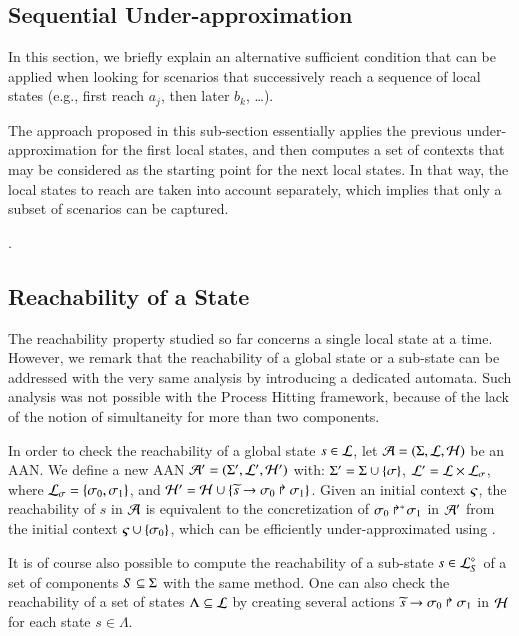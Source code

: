 \subsection{Sequential Under-approximation}
\label{ssec:ordered-ua}

In this section, we briefly explain an alternative sufficient condition that
can be applied when looking for scenarios that successively reach a sequence of local states (e.g.,
first reach $a_j$, then later $b_k$, \ldots).

The approach proposed in this sub-section essentially applies the previous under-approximation for
the first local states, and then computes a set of contexts that may be considered as the starting
point for the next local states.
In that way, the local states to reach are taken into account separately, which implies that only a
subset of scenarios can be captured.


.



\subsection{Reachability of a State}
\label{ssec:simult-ua}

\newcommand{\total}{\tau}
\newcommand{\reach}{\sigma}

The reachability property studied so far concerns a single local state at a time.
However, we remark that the reachability of a global state or a sub-state can be
addressed with the very same analysis by introducing a dedicated automata.
Such analysis was not possible with the Process Hitting framework,
because of the lack of the notion of simultaneity for more than two components.

In order to check the reachability of a global state $s \in \PHl$,
let $\PH = (\PHs, \PHl, \PHh)$ be an AAN.
We define a new AAN $\PH' = (\PHs', \PHl', \PHh')$ with:
$\PHs' = \PHs \cup \{ \reach \}$, $\PHl' = \PHl \times \PHl_\reach$,
where $\PHl_\reach = \{ \reach_0, \reach_1 \}$,
and $\PHh' = \PHh \cup \{ \PHhit{\toset{s}}{\reach_0}{\reach_1} \}$.
Given an initial context $\ctx$, the reachability of $s$ in $\PH$
is equivalent to the concretization of $\PHobjp{\reach}{0}{1}$ in $\PH'$
from the initial context $\ctx \cup \{ \reach_0 \}$,
which can be efficiently under-approximated using .

It is of course also possible to compute the reachability
of a sub-state $s \in \PHsubl[\PHl]_S$ of a set of components $S \subseteq \PHs$
with the same method.
One can also check the reachability of a set of states $\Lambda \subseteq \PHl$
by creating several actions
$\PHhit{\toset{s}}{\reach_0}{\reach_1}$ in $\PHh$ for each state $s \in \Lambda$.
